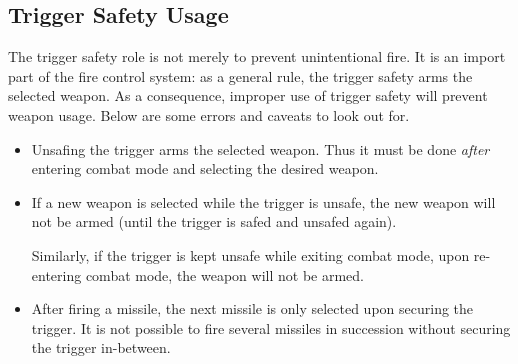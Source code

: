 \documentclass[a4paper]{report}
\begin{document}
\subsection{Trigger Safety Usage}
The trigger safety role is not merely to prevent unintentional fire.
It is an import part of the fire control system:
as a general rule, the trigger safety arms the selected weapon.
As a consequence, improper use of trigger safety will prevent weapon usage.
Below are some errors and caveats to look out for.
\begin{itemize}
  \item Unsafing the trigger arms the selected weapon.
    Thus it must be done \emph{after} entering combat mode and selecting the desired weapon.
  \item If a new weapon is selected while the trigger is unsafe,
    the new weapon will not be armed (until the trigger is safed and unsafed again).

    Similarly, if the trigger is kept unsafe while exiting combat mode,
    upon re-entering combat mode, the weapon will not be armed.
  \item After firing a missile, the next missile is only selected upon securing the trigger.
    It is not possible to fire several missiles in succession without securing the trigger in-between.
\end{itemize}
\end{document}
